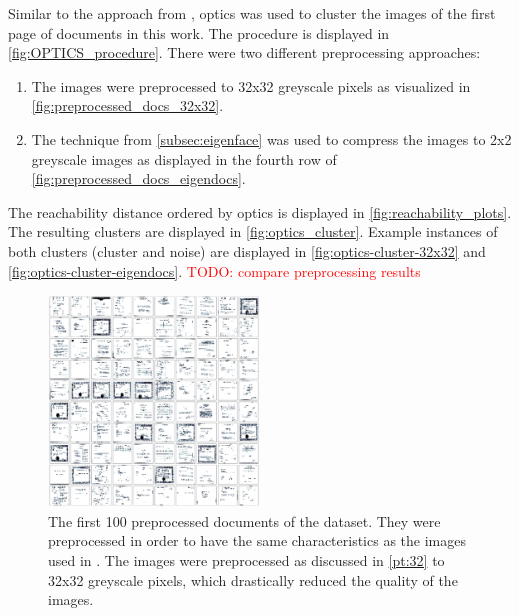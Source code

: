 Similar to the approach from \cite{OPTICS1999}, \ac{optics} was used to cluster the images of the first page of documents in this work.
The procedure is displayed in \autoref{fig:OPTICS_procedure}.
There were two different preprocessing approaches:
\begin{enumerate}
    \item \label{pt:32}The images were preprocessed to 32x32 greyscale pixels as visualized in \autoref{fig:preprocessed_docs_32x32}.
    \item \label{pt:eigendocs}The technique \eigendocs{} from \autoref{subsec:eigenface} 
    was used to compress the images to 2x2 greyscale images as displayed in the fourth row of \autoref{fig:preprocessed_docs_eigendocs}.
\end{enumerate}

The reachability distance ordered by \ac{optics} is displayed in \autoref{fig:reachability_plots}.
The resulting clusters are displayed in \autoref{fig:optics_cluster}.
Example instances of both clusters (cluster and noise) are displayed in \autoref{fig:optics-cluster-32x32} and \autoref{fig:optics-cluster-eigendocs}.
\textcolor{red}{TODO: compare preprocessing results}


\begin{figure}[htp] %
    \centering
    \includegraphics[width=0.5\textwidth]{images/OPTICS/32x32/preprocessed_docs.pdf}
    \caption{The first 100 preprocessed documents of the dataset.
    They were preprocessed in order to have the same characteristics as the images used in \cite{OPTICS1999}.
    The images were preprocessed as discussed in \autoref{pt:32} to 32x32 greyscale pixels, which drastically reduced the quality of the images.
    }
    \label{fig:preprocessed_docs_32x32}
\end{figure}

